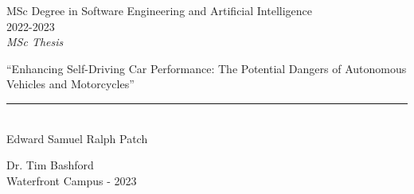 \documentclass[12pt]{report} %
\begin{document}

\begin{titlepage}
	\begin{sffamily}
		\color{azulUC3M}
		\begin{center}
			\begin{figure}[H] %
			\end{figure}
			\vspace{2.5cm}
			\begin{Large}
				MSc Degree in Software Engineering and Artificial Intelligence\\
				2022-2023\\ %
				\vspace{2cm}
				\textsl{MSc Thesis}
				\bigskip

			\end{Large}
			{\Huge ``Enhancing Self-Driving Car Performance: The Potential Dangers of Autonomous Vehicles and Motorcycles''}\\
			\vspace*{0.5cm}
			\rule{10.5cm}{0.1mm}\\
			\vspace*{0.9cm}
			{\LARGE Edward Samuel Ralph Patch}\\
			\vspace*{1cm}
			\begin{Large}
				Dr. Tim Bashford\\
				Waterfront Campus - 2023\\
			\end{Large}
		\end{center}
		\vfill
		\color{black}

	\end{sffamily}
\end{titlepage}

\newpage %
\thispagestyle{empty}
\mbox{}

\newpage %
\thispagestyle{empty}
\mbox{}
\end{document}

